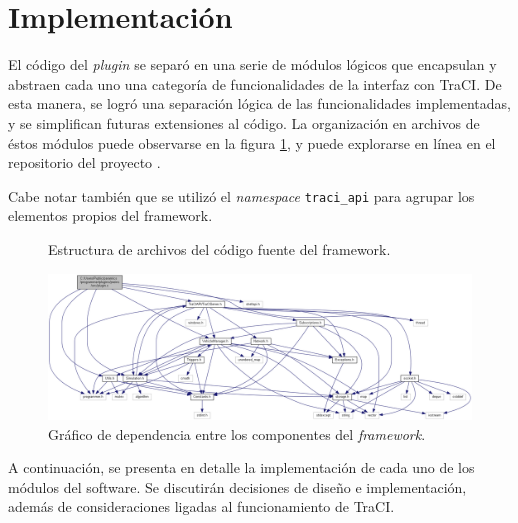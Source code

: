 \section{Implementación}\label{sec:implementacion}

El código del \emph{plugin} se separó en una serie de módulos lógicos que encapsulan y abstraen cada uno una categoría de funcionalidades de la interfaz con TraCI. De esta manera, se logró una separación lógica de las funcionalidades implementadas, y se simplifican futuras extensiones al código. La organización en archivos de éstos módulos puede observarse en la figura \ref{fig:dirtree}, y puede explorarse en línea en el repositorio del proyecto \autocite{pveins_github}.

Cabe notar también que se utilizó el \emph{namespace} \texttt{traci\_api} para agrupar los elementos propios del framework. 

\begin{figure}[tpbh]
    \caption{Estructura de archivos del código fuente del framework.}
    \label{fig:dirtree}
\end{figure}

\begin{figure}[tpbh]
    \centering
    \includegraphics[angle=90, origin=c, height=0.6\textheight]{figuras/plugin_dependency_graph.png}
    \caption{Gráfico de dependencia entre los componentes del \emph{framework}.}
    \label{fig:dependencygraph}
\end{figure}

A continuación, se presenta en detalle la implementación de cada uno de los módulos del software. Se discutirán decisiones de diseño e implementación, además de consideraciones ligadas al funcionamiento de TraCI.